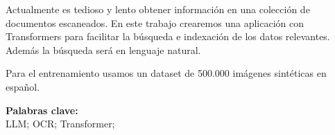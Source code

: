 \documentclass[../main.tex]{subfiles}
\begin{document}



Actualmente es tedioso y lento obtener información en una colección de documentos escaneados.
En este trabajo crearemos una aplicación con Transformers para facilitar la búsqueda e indexación de los datos relevantes.
Además la búsqueda será en lenguaje natural.

Para el entrenamiento usamos un dataset de 500.000 imágenes sintéticas en español.


%

%
%

\noindent \textbf{Palabras clave:}\\
\noindent LLM; OCR; Transformer;
\end{document}
